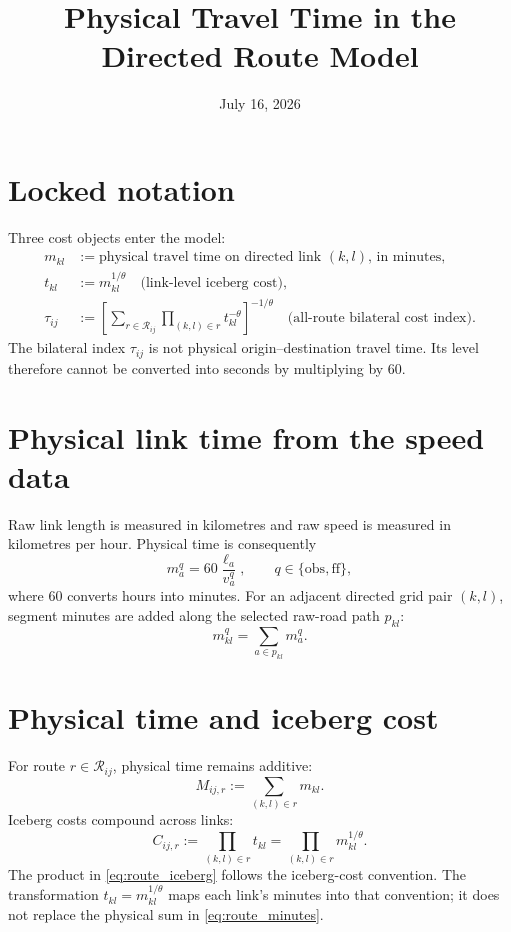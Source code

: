 \documentclass[12pt]{article}
\title{Physical Travel Time in the Directed Route Model}
\author{}
\date{July 16, 2026}
\newcommand{\R}{\mathcal R}
\newcommand{\obs}{\mathrm{obs}}
\newcommand{\ff}{\mathrm{ff}}
\begin{document}
\maketitle

\section{Locked notation}

Three cost objects enter the model:
\begin{align*}
m_{kl}
&:= \text{physical travel time on directed link $(k,l)$, in minutes},\\
t_{kl}
&:=m_{kl}^{1/\theta}
   \quad\text{(link-level iceberg cost)},\\
\tau_{ij}
&:=\left[
  \sum_{r\in\R_{ij}}
  \prod_{(k,l)\in r}t_{kl}^{-\theta}
  \right]^{-1/\theta}
   \quad\text{(all-route bilateral cost index)}.
\end{align*}
The bilateral index $\tau_{ij}$ is not physical origin--destination travel
time. Its level therefore cannot be converted into seconds by multiplying by
60.

\section{Physical link time from the speed data}

Raw link length is measured in kilometres and raw speed is measured in
kilometres per hour. Physical time is consequently
\begin{equation}
  m_a^q
  =60\frac{\ell_a}{v_a^q},
  \qquad q\in\{\obs,\ff\},
  \label{eq:segment_time}
\end{equation}
where 60 converts hours into minutes. For an adjacent directed grid pair
$(k,l)$, segment minutes are added along the selected raw-road path $p_{kl}$:
\begin{equation}
  m_{kl}^q
  =\sum_{a\in p_{kl}}m_a^q.
  \label{eq:grid_time}
\end{equation}

\section{Physical time and iceberg cost}

For route $r\in\R_{ij}$, physical time remains additive:
\begin{equation}
  M_{ij,r}
  :=\sum_{(k,l)\in r}m_{kl}.
  \label{eq:route_minutes}
\end{equation}
Iceberg costs compound across links:
\begin{equation}
  C_{ij,r}
  :=\prod_{(k,l)\in r}t_{kl}
  =\prod_{(k,l)\in r}m_{kl}^{1/\theta}.
  \label{eq:route_iceberg}
\end{equation}
The product in \eqref{eq:route_iceberg} follows the iceberg-cost convention.
The transformation $t_{kl}=m_{kl}^{1/\theta}$ maps each link's minutes into
that convention; it does not replace the physical sum in
\eqref{eq:route_minutes}.
\end{document}
